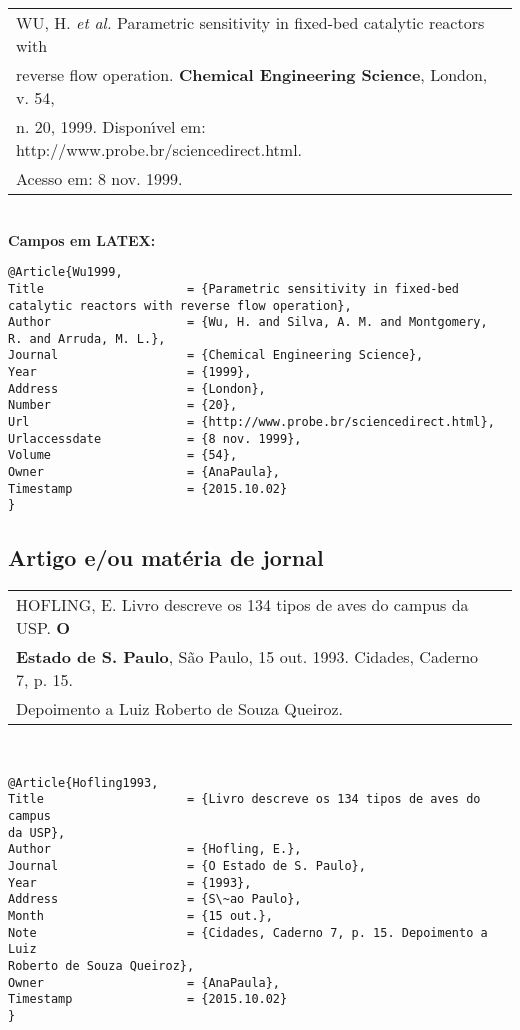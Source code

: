 \begin{tabular}{|l|c|} \hline
	WU, H. \textit{et al.} Parametric sensitivity in fixed-bed catalytic reactors with \\
	reverse flow operation. \textbf{Chemical Engineering Science}, London, v. 54,\\
	n. 20, 1999. Dispon\'{\i}vel em: http://www.probe.br/sciencedirect.html. \\Acesso em: 8 nov. 1999. \\\hline
\end{tabular} \\

\textbf{Campos em LATEX:} 

\begin{verbatim}
@Article{Wu1999,
Title                    = {Parametric sensitivity in fixed-bed 
catalytic reactors with reverse flow operation},
Author                   = {Wu, H. and Silva, A. M. and Montgomery, 
R. and Arruda, M. L.},
Journal                  = {Chemical Engineering Science},
Year                     = {1999},
Address                  = {London},
Number                   = {20},
Url                      = {http://www.probe.br/sciencedirect.html},
Urlaccessdate            = {8 nov. 1999},
Volume                   = {54},
Owner                    = {AnaPaula},
Timestamp                = {2015.10.02}
}
\end{verbatim}


\subsection{Artigo e/ou mat\'eria de jornal}

\begin{tabular}{|l|c|} \hline
	HOFLING, E. Livro descreve os 134 tipos de aves do campus da USP. \textbf{O} \\ \textbf{Estado de S. Paulo}, S\~ao Paulo, 15 out. 1993. Cidades, Caderno 7, p. 15. \\Depoimento a Luiz Roberto de Souza Queiroz.	\\\hline
\end{tabular} \\

\begin{verbatim}
@Article{Hofling1993,
Title                    = {Livro descreve os 134 tipos de aves do campus
da USP},
Author                   = {Hofling, E.},
Journal                  = {O Estado de S. Paulo},
Year                     = {1993},
Address                  = {S\~ao Paulo},
Month                    = {15 out.},
Note                     = {Cidades, Caderno 7, p. 15. Depoimento a Luiz 
Roberto de Souza Queiroz},
Owner                    = {AnaPaula},
Timestamp                = {2015.10.02}
}
\end{verbatim}

